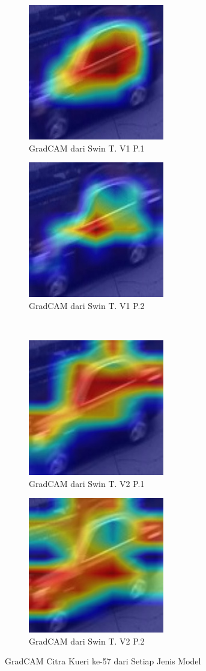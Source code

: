 \begin{figure}[h!]
  \centering
  \begin{subfigure}{.5\textwidth}
    \centering
    \includegraphics[width=.3\linewidth]{gambar/Que57_gradCAMV1P1IT3.jpg}
    \caption{GradCAM dari Swin T. V1 P.1}
    \label{gradcamkuerinomorlimatujuhV1P1}
  \end{subfigure}%
  \begin{subfigure}{.5\textwidth}
    \centering
    \includegraphics[width=.3\linewidth]{gambar/Que57_gradCAMV1P2IT2.jpg}
    \caption{GradCAM dari Swin T. V1 P.2}
    \label{gradcamkuerinomorlimatujuhV1P2}
  \end{subfigure}
  \\
  \begin{subfigure}{.5\textwidth}
    \centering
    \includegraphics[width=.3\linewidth]{gambar/Que57_V2P1IT1.png}
    \caption{GradCAM dari Swin T. V2 P.1}
    \label{gradcamkuerinomorlimatujuhV2P1}
  \end{subfigure}%
  \begin{subfigure}{.5\textwidth}
    \centering
    \includegraphics[width=.3\linewidth]{gambar/Que57_V2P2IT3.png}
    \caption{GradCAM dari Swin T. V2 P.2}
    \label{gradcamkuerinomorlimatujuhV2P2}
  \end{subfigure}
  \caption{GradCAM Citra Kueri ke-57 dari Setiap Jenis Model}
  \label{fig:gradcamdarisetiapjenismodelpengujiankedua}
\end{figure}


